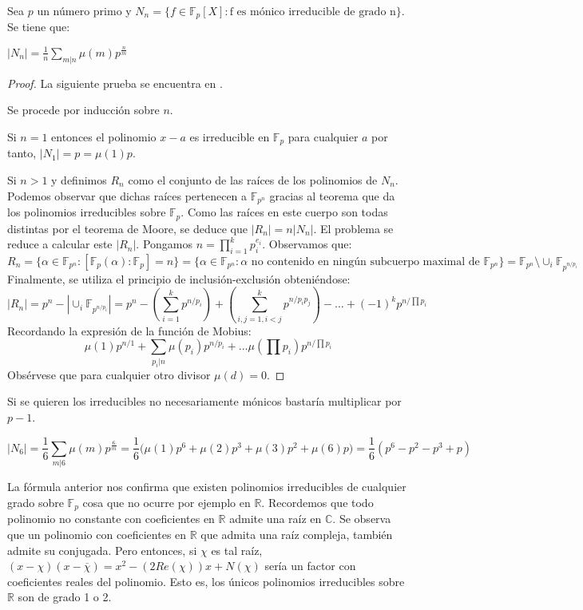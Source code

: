 \begin{theorem}
Sea $p$ un número primo y $N_n = \{f \in \mathbb{F}_p[X]:\text{f es mónico irreducible de grado n}\}$. Se tiene que:

$|N_n| = \frac{1}{n} \sum_{m|n} \mu(m) p^{\frac{n}{m}}$
\end{theorem}
\begin{proof}
La siguiente prueba se encuentra en \cite{counting-irreducible}. 
	
Se procede por inducción sobre $n$. 
	
Si $n = 1$ entonces el polinomio $x-a$ es irreducible en $\mathbb{F}_p$ para cualquier $a$ por tanto, $|N_1| = p = \mu(1)p$. 
	
Si $n > 1$ y definimos $R_n$ como el conjunto de las raíces de los polinomios de $N_n$. Podemos observar que dichas raíces pertenecen a $\mathbb{F}_{p^n}$ gracias al teorema que da los polinomios irreducibles sobre $\mathbb{F}_p$. Como las raíces en este cuerpo son todas distintas por el teorema de Moore, se deduce que $|R_n| = n |N_n|$. El problema se reduce a calcular este $|R_n|$. Pongamos $n = \prod_{i = 1}^k p_i^{e_i}$. Observamos que: $$R_n = \{\alpha \in \mathbb{F}_{p^n}:[\mathbb{F}_p(\alpha):\mathbb{F}_p] = n \} = \{ \alpha \in \mathbb{F}_{p^n}: \alpha \text{ no    contenido en ningún subcuerpo maximal de } \mathbb{F}_{p^n} \} = \mathbb{F}_{p^n} \setminus \cup_i \mathbb{F}_{p^{n/p_i}}$$ Finalmente, se utiliza el principio de inclusión-exclusión obteniéndose: $$|R_n| = p^n - | \cup_i \mathbb{F}_{p^{n/ p_i} }| = p^n - (\sum_{i = 1}^k p^{n/p_i}) + (\sum_{i,j = 1, i < j}^k p^{n/p_i p_j}) - \ldots +(-1)^k p^{n/ \prod p_i}$$ Recordando la expresión de la función de Mobius: $$\mu(1)p^{n/1}+\sum_{p_i |n} \mu(p_i)p^{n/p_i}+ \ldots \mu(\prod p_i) p^{n/\prod p_i}$$ Obsérvese que para cualquier otro divisor $\mu(d) = 0$. 
\end{proof}

Si se quieren los irreducibles no necesariamente mónicos bastaría multiplicar por $p-1$. 	

\begin{example}[Cálculo de $|N_6|$]
$$|N_6| = \frac{1}{6} \sum_{m|6} \mu(m) p^{\frac{6}{m}} =  \frac{1}{6} \Big(\mu(1)p^{6} + \mu(2)p^{3} + \mu(3)p^{2} + \mu(6)p\Big) = \frac{1}{6}(p^{6}-p^{2}-p^{3}+p)$$
\end{example}

La fórmula anterior nos confirma que existen polinomios irreducibles de cualquier grado sobre $\mathbb{F}_p$ cosa que no ocurre por ejemplo en $\mathbb{R}$. Recordemos que todo polinomio no constante con coeficientes en $\mathbb{R}$ admite una raíz en $\mathbb{C}$. Se observa que un polinomio con coeficientes en $\mathbb{R}$ que admita una raíz compleja, también admite su conjugada. Pero entonces, si $\chi$ es tal raíz, $(x-\chi)(x-\overline{\chi}) = x^2-(2Re(\chi))x + N(\chi)$ sería un factor con coeficientes reales del polinomio. Esto es, los únicos polinomios irreducibles sobre $\mathbb{R}$ son de grado 1 o 2. 

